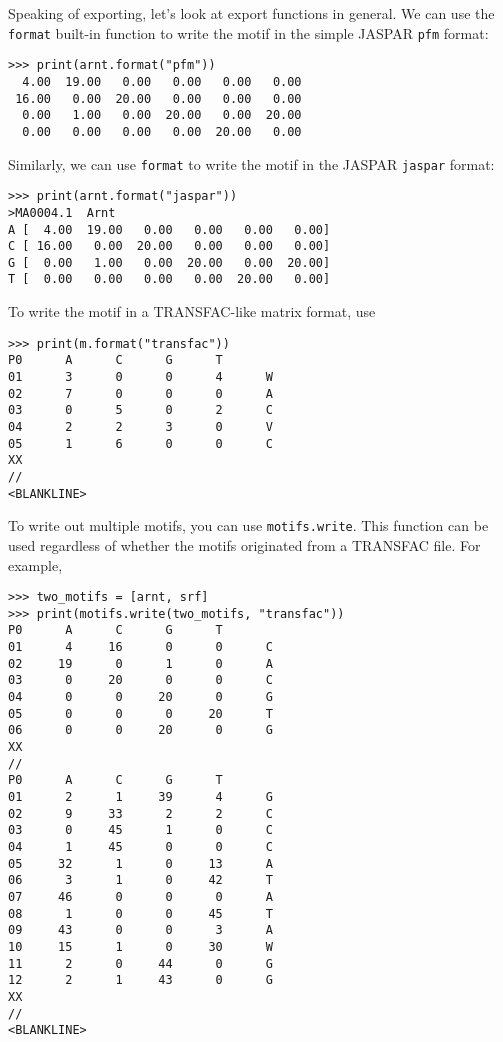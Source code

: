 Speaking of exporting, let's look at export functions in general.
We can use the \verb+format+ built-in function to write the motif in the simple JASPAR \verb+pfm+ format:
\begin{verbatim}
>>> print(arnt.format("pfm"))
  4.00  19.00   0.00   0.00   0.00   0.00
 16.00   0.00  20.00   0.00   0.00   0.00
  0.00   1.00   0.00  20.00   0.00  20.00
  0.00   0.00   0.00   0.00  20.00   0.00
\end{verbatim}
Similarly, we can use \verb+format+ to write the motif in the JASPAR \verb+jaspar+ format:
\begin{verbatim}
>>> print(arnt.format("jaspar"))
>MA0004.1  Arnt
A [  4.00  19.00   0.00   0.00   0.00   0.00]
C [ 16.00   0.00  20.00   0.00   0.00   0.00]
G [  0.00   1.00   0.00  20.00   0.00  20.00]
T [  0.00   0.00   0.00   0.00  20.00   0.00]
\end{verbatim}

To write the motif in a TRANSFAC-like matrix format, use

\begin{verbatim}
>>> print(m.format("transfac"))
P0      A      C      G      T
01      3      0      0      4      W
02      7      0      0      0      A
03      0      5      0      2      C
04      2      2      3      0      V
05      1      6      0      0      C
XX
//
<BLANKLINE>
\end{verbatim}

To write out multiple motifs, you can use \verb+motifs.write+.
This function can be used regardless of whether the motifs originated from a TRANSFAC file. For example,

\begin{verbatim}
>>> two_motifs = [arnt, srf]
>>> print(motifs.write(two_motifs, "transfac"))
P0      A      C      G      T
01      4     16      0      0      C
02     19      0      1      0      A
03      0     20      0      0      C
04      0      0     20      0      G
05      0      0      0     20      T
06      0      0     20      0      G
XX
//
P0      A      C      G      T
01      2      1     39      4      G
02      9     33      2      2      C
03      0     45      1      0      C
04      1     45      0      0      C
05     32      1      0     13      A
06      3      1      0     42      T
07     46      0      0      0      A
08      1      0      0     45      T
09     43      0      0      3      A
10     15      1      0     30      W
11      2      0     44      0      G
12      2      1     43      0      G
XX
//
<BLANKLINE>
\end{verbatim}

